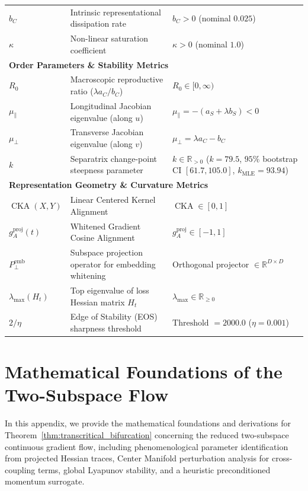 \documentclass{article}
\theoremstyle{plain}
\theoremstyle{definition}
\DeclareMathOperator{\CKA}{CKA}
\begin{document}
\begin{table}[h]
\begin{small}
\begin{tabular}{lll}
$b_C$ & Intrinsic representational dissipation rate & $b_C > 0$ (nominal $0.025$) \\
$\kappa$ & Non-linear saturation coefficient & $\kappa > 0$ (nominal $1.0$) \\
\midrule
\multicolumn{3}{l}{\textbf{Order Parameters \& Stability Metrics}} \\
$R_0$ & Macroscopic reproductive ratio ($\lambda a_C / b_C$) & $R_0 \in [0, \infty)$ \\
$\mu_{\parallel}$ & Longitudinal Jacobian eigenvalue (along $u$) & $\mu_{\parallel} = -(a_S + \lambda b_S) < 0$ \\
$\mu_{\perp}$ & Transverse Jacobian eigenvalue (along $v$) & $\mu_{\perp} = \lambda a_C - b_C$ \\
$k$ & Separatrix change-point steepness parameter & $k \in \mathbb{R}_{> 0}$ ($k = 79.5$, $95\%$ bootstrap CI $[61.7, 105.0]$, $k_{\text{MLE}} = 93.94$) \\
\multicolumn{3}{l}{\textbf{Representation Geometry \& Curvature Metrics}} \\
$\CKA(X, Y)$ & Linear Centered Kernel Alignment & $\CKA \in [0, 1]$ \\
$g_A^{\text{proj}}(t)$ & Whitened Gradient Cosine Alignment & $g_A^{\text{proj}} \in [-1, 1]$ \\
$P_{\perp}^{\text{emb}}$ & Subspace projection operator for embedding whitening & Orthogonal projector $\in \mathbb{R}^{D \times D}$ \\
$\lambda_{\text{max}}(H_t)$ & Top eigenvalue of loss Hessian matrix $H_t$ & $\lambda_{\text{max}} \in \mathbb{R}_{\ge 0}$ \\
$2/\eta$ & Edge of Stability (EOS) sharpness threshold & $\text{Threshold } = 2000.0$ ($\eta = 0.001$) \\
\bottomrule
\end{tabular}
\end{small}
\end{table}

\section{Mathematical Foundations of the Two-Subspace Flow}
\label{sec:appendix_proof}

In this appendix, we provide the mathematical foundations and derivations for Theorem~\ref{thm:transcritical_bifurcation} concerning the reduced two-subspace continuous gradient flow, including phenomenological parameter identification from projected Hessian traces, Center Manifold perturbation analysis for cross-coupling terms, global Lyapunov stability, and a heuristic preconditioned momentum surrogate.
\end{document}
